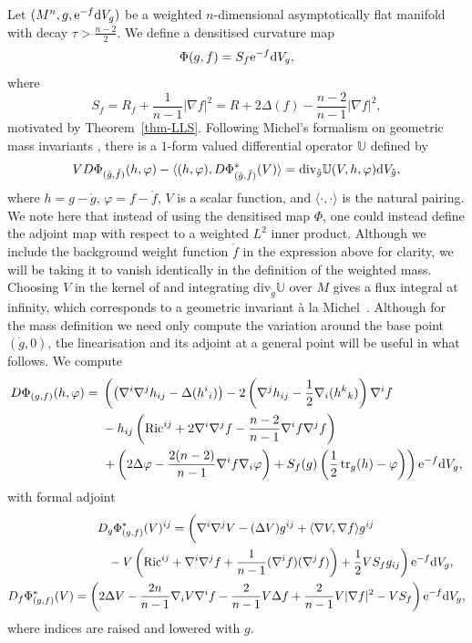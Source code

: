 \documentclass[pdftex]{sigma}
\numberwithin{equation}{section}
\theoremstyle{definition}
\begin{document}
Let $(M^n,g,{\rm e}^{-f}{\rm d}V_g)$ be a weighted $n$-dimensional asymptotically flat manifold with decay $\tau>\frac{n-2}{2}$. We define a densitised curvature map
\[
\Phi(g,f)= S_f {\rm e}^{-f}{\rm d}V_g,
\]
where
\[
	S_f=R_f+\frac{1}{n-1}|\nabla f|^2=R+2\Delta(f)- \frac{n-2}{n-1}|\nabla f|^2,
\]
motivated by Theorem~\ref{thm-LLS}. Following Michel's formalism on geometric mass invariants \cite{Michel11}, there is a $1$-form valued differential operator $\mathbb U$ defined by
\begin{equation*}%
	V D\Phi_{(\mathring{g},\mathring{f})}(h, \varphi)-\langle(h,\varphi),D\Phi_{(\mathring{g},\mathring{f})}^*(V)\rangle=\mathrm{div}_{\mathring g}\mathbb U(V,h,\varphi){\rm d}V_{\mathring g},
\end{equation*}
where $h=g-\mathring g$, $\varphi=f-\mathring f$, $V$ is a scalar function, and $\langle \cdot,\cdot\rangle$ is the natural pairing. We note here that instead of using the densitised map $\Phi$, one could instead define the adjoint map with respect to a weighted $L^2$ inner product. Although we include the background weight function $\mathring f$ in the expression above for clarity, we will be taking it to vanish identically in the definition of the weighted mass. Choosing $V$ in the kernel of  and integrating $\mathrm{div}_{\mathring g}\mathbb U$ over $M$ gives a flux integral at infinity, which corresponds to a geometric invariant \`a la Michel~\cite{Michel11}. Although for the mass definition we need only compute the variation around the base point $(\mathring g,0)$, the linearisation and its adjoint at a general point will be useful in what follows. We compute
\begin{align*}
		D\Phi_{(g,f)}(h,\varphi) ={}& \left(
		\bigl( \nabla^i \nabla^j h_{ij} - \Delta(h^i{}_i) \bigr)
		- 2\left( \nabla^j h_{ij} - \frac{1}{2}\nabla_i(h^k{}_k) \right)\nabla^i f\right. \nonumber\\
		&  - h_{ij}\left( \mathrm{Ric}^{ij} + 2\nabla^i \nabla^j f - \frac{n-2}{n-1} \nabla^i f \nabla^j f \right)\nonumber \\
		& \left. +\left(2 \Delta \varphi - \frac{2(n-2)}{n-1} \nabla^i f  \nabla_i \varphi\right)
		 +S_f(g)\left( \frac12 \operatorname{tr}_g(h)-\varphi \right)\right){\rm e}^{-f}{\rm d}V_g,
\end{align*}
with formal adjoint
\begin{gather}
		D_g\Phi_{(g,f)}^*(V)^{ij}
		  = \left(
		\nabla^i\nabla^j V-(\Delta V) g^{ij}
		+\langle\nabla V,\nabla f\rangle g^{ij}\vphantom{\frac{1}{n-1}}\right. \nonumber\\
\left. \hphantom{D_g\Phi_{(g,f)}^*(V)^{ij}=}{}
		- V\left(\mathrm{Ric}^{ij}+\nabla^i\nabla^j f+\frac{1}{n-1} (\nabla^i f)(\nabla^j f)\right)
 +\frac12 V S_f g_{ij}
		\right) {\rm e}^{-f}{\rm d}V_g,\label{eq-adjoint}\\
		D_f\Phi_{(g,f)}^*(V)
		  = \left(
		2\Delta V
		-\frac{2n}{n-1} \nabla_i V \nabla^i f
		-\frac{2}{n-1} V \Delta f
		 +\frac{2}{n-1} V |\nabla f|^2
		- V S_f
		\right) {\rm e}^{-f}{\rm d}V_g,\nonumber
\end{gather}
where indices are raised and lowered with $g$.
\end{document}
